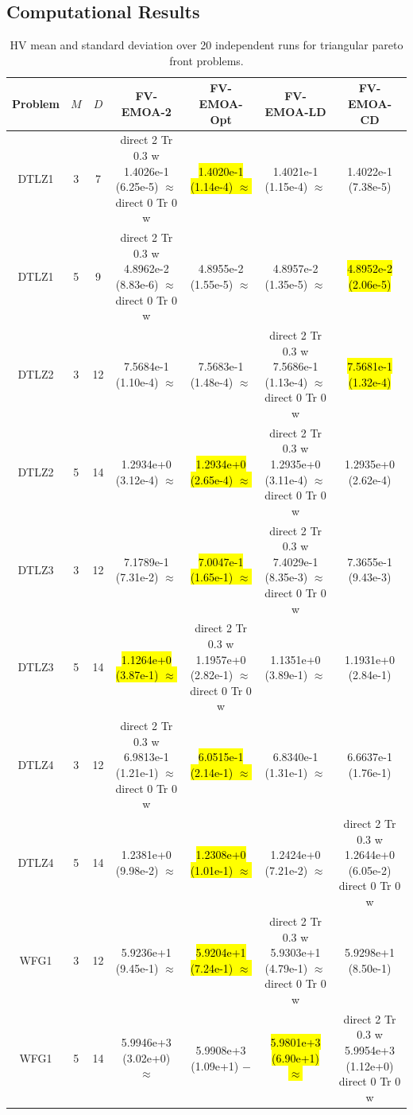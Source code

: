 \documentclass[conference]{IEEEtran}
\newcommand{\semitextbf}[1]{%
	\pdfliteral direct {2 Tr 0.3 w} %
	#1%
	\pdfliteral direct {0 Tr 0 w}%
}
\begin{document}
\subsection{Computational Results}
\begin{table}[!t]\small
  \caption{HV mean and standard deviation over 20 independent runs for triangular pareto front problems.} %
  \label{table_FVEMOA_tri}
  \centering
  \begin{tabular}{ccccccc}
    \toprule
    Problem&$M$&$D$&FV-EMOA-2&FV-EMOA-Opt&FV-EMOA-LD&FV-EMOA-CD\\ 
    \midrule
    \multirow{1}{*}{DTLZ1}&3&7&\semitextbf{1.4026e-1 (6.25e-5) $\approx$}&\hl{1.4020e-1 (1.14e-4) $\approx$}&1.4021e-1 (1.15e-4) $\approx$&1.4022e-1 (7.38e-5)\\
    \multirow{1}{*}{DTLZ1}&5&9&\semitextbf{4.8962e-2 (8.83e-6) $\approx$}&4.8955e-2 (1.55e-5) $\approx$&4.8957e-2 (1.35e-5) $\approx$&\hl{4.8952e-2 (2.06e-5)}\\
    \multirow{1}{*}{DTLZ2}&3&12&7.5684e-1 (1.10e-4) $\approx$&7.5683e-1 (1.48e-4) $\approx$&\semitextbf{7.5686e-1 (1.13e-4) $\approx$}&\hl{7.5681e-1 (1.32e-4)}\\
    \multirow{1}{*}{DTLZ2}&5&14&1.2934e+0 (3.12e-4) $\approx$&\hl{1.2934e+0 (2.65e-4) $\approx$}&\semitextbf{1.2935e+0 (3.11e-4) $\approx$}&1.2935e+0 (2.62e-4)\\
    \multirow{1}{*}{DTLZ3}&3&12&7.1789e-1 (7.31e-2) $\approx$&\hl{7.0047e-1 (1.65e-1) $\approx$}&\semitextbf{7.4029e-1 (8.35e-3) $\approx$}&7.3655e-1 (9.43e-3)\\
    \multirow{1}{*}{DTLZ3}&5&14&\hl{1.1264e+0 (3.87e-1) $\approx$}&\semitextbf{1.1957e+0 (2.82e-1) $\approx$}&1.1351e+0 (3.89e-1) $\approx$&1.1931e+0 (2.84e-1)\\
    \multirow{1}{*}{DTLZ4}&3&12&\semitextbf{6.9813e-1 (1.21e-1) $\approx$}&\hl{6.0515e-1 (2.14e-1) $\approx$}&6.8340e-1 (1.31e-1) $\approx$&6.6637e-1 (1.76e-1)\\
    \multirow{1}{*}{DTLZ4}&5&14&1.2381e+0 (9.98e-2) $\approx$&\hl{1.2308e+0 (1.01e-1) $\approx$}&1.2424e+0 (7.21e-2) $\approx$&\semitextbf{1.2644e+0 (6.05e-2)}\\
    \hline
    \multirow{1}{*}{WFG1}&3&12&5.9236e+1 (9.45e-1) $\approx$&\hl{5.9204e+1 (7.24e-1) $\approx$}&\semitextbf{5.9303e+1 (4.79e-1) $\approx$}&5.9298e+1 (8.50e-1)\\
    \multirow{1}{*}{WFG1}&5&14&5.9946e+3 (3.02e+0) $\approx$&5.9908e+3 (1.09e+1) $-$&\hl{5.9801e+3 (6.90e+1) $\approx$}&\semitextbf{5.9954e+3 (1.12e+0)}\\

\end{tabular}
\end{table}
\end{document}
